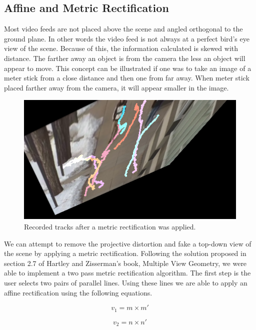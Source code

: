 \documentclass[12pt, onecolumn, conference]{IEEEtran}
\begin{document}
\subsection{Affine and Metric Rectification}

Most video feeds are not placed above the scene and angled orthogonal to the ground plane. In other words the video feed is not always at a perfect bird's eye view of the scene. Because of this, the information calculated is skewed with distance. The farther away an object is from the camera the less an object will appear to move. This concept can be illustrated if one was to take an image of a meter stick from a close distance and then one from far away. When meter stick  placed farther away from the camera, it will appear smaller in the image.

\begin{figure}[!t]
\centering
\includegraphics[height=2.5in]{Screenshots/HaarCascade_HomographyAppliedTracks.png}
\caption{Recorded tracks after a metric rectification was applied.}
\label{Rectification}
\end{figure}


We can attempt to remove the projective distortion and fake a top-down view of the scene by applying a metric rectification. Following the solution proposed in section 2.7 of Hartley and Zisserman's book, Multiple View Geometry, we were able to implement a two pass metric rectification algorithm. The first step is the user selects two pairs of parallel lines. Using these lines we are able to apply an affine rectification using the following equations.

\begin{equation}
v_1 = m \times m'
\end{equation}

\begin{equation}
v_2 = n \times n'
\end{equation}
\end{document}
